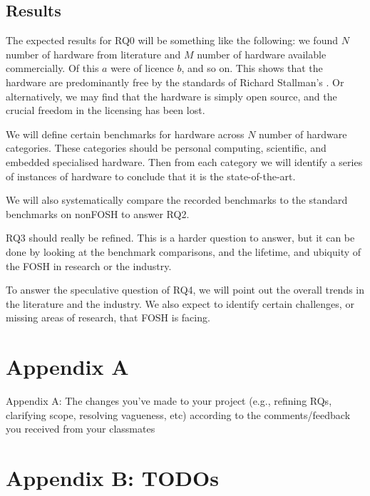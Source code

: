 \documentclass{article}
\begin{document}
\subsection{Results}

The expected results for RQ0 will be something like the following:
we found $N$ number of hardware from literature and $M$ number of hardware available commercially. 
Of this $a$ were of licence $b$, and so on. 
This shows that the hardware are predominantly free by the standards of Richard Stallman's \cite{b0_stallman}.
Or alternatively, we may find that the hardware is simply open source, and the crucial freedom in the licensing has been lost. 

We will define certain benchmarks for hardware across $N$ number of hardware categories. 
These categories should be personal computing, scientific, and embedded specialised hardware. 
Then from each category we will identify a series of instances of hardware to conclude that it is the state-of-the-art.

We will also systematically compare the recorded benchmarks to the standard benchmarks on nonFOSH to answer RQ2. 

RQ3 should really be refined. 
This is a harder question to answer, but it can be done by looking at the benchmark comparisons, and the lifetime, and ubiquity of the FOSH in research or the industry.

To answer the speculative question of RQ4, we will point out the overall trends in the literature and the industry. 
We also expect to identify certain challenges, or missing areas of research, that FOSH is facing.

\section{Appendix A}
Appendix A: The changes you've made to your project 
(e.g., refining RQs, clarifying scope, resolving vagueness, etc) 
according to the comments/feedback you received from your classmates


\section{Appendix B: TODOs}
\end{document}
